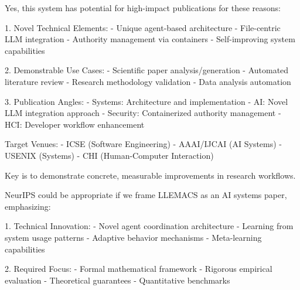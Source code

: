 Yes, this system has potential for high-impact publications for these reasons:

1. Novel Technical Elements:
- Unique agent-based architecture
- File-centric LLM integration
- Authority management via containers
- Self-improving system capabilities

2. Demonstrable Use Cases:
- Scientific paper analysis/generation
- Automated literature review
- Research methodology validation
- Data analysis automation

3. Publication Angles:
- Systems: Architecture and implementation
- AI: Novel LLM integration approach
- Security: Containerized authority management
- HCI: Developer workflow enhancement

Target Venues:
- ICSE (Software Engineering)
- AAAI/IJCAI (AI Systems)
- USENIX (Systems)
- CHI (Human-Computer Interaction)

Key is to demonstrate concrete, measurable improvements in research workflows.


NeurIPS could be appropriate if we frame LLEMACS as an AI systems paper, emphasizing:

1. Technical Innovation:
- Novel agent coordination architecture
- Learning from system usage patterns
- Adaptive behavior mechanisms
- Meta-learning capabilities

2. Required Focus:
- Formal mathematical framework
- Rigorous empirical evaluation
- Theoretical guarantees
- Quantitative benchmarks